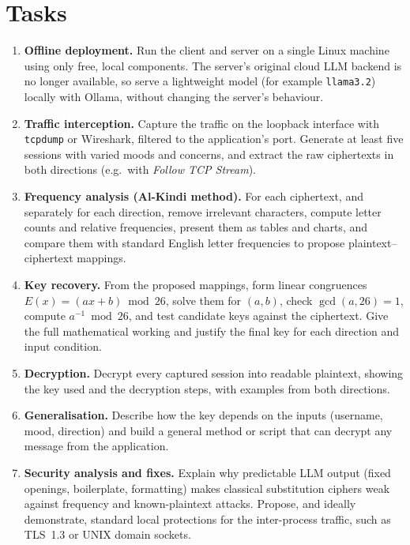 \documentclass[11pt,a4paper]{article}
\newcommand{\ct}[1]{\texttt{#1}}
\begin{document}
\section*{Tasks}
\begin{enumerate}[label=\arabic*.]
\item \textbf{Offline deployment.} Run the client and server on a single Linux machine using only free, local
      components. The server's original cloud LLM backend is no longer available, so serve a lightweight model (for
      example \ct{llama3.2}) locally with Ollama, without changing the server's behaviour.

\item \textbf{Traffic interception.} Capture the traffic on the loopback interface with \ct{tcpdump} or Wireshark,
      filtered to the application's port. Generate at least five sessions with varied moods and concerns, and
      extract the raw ciphertexts in both directions (e.g.\ with \emph{Follow TCP Stream}).

\item \textbf{Frequency analysis (Al-Kindi method).} For each ciphertext, and separately for each direction, remove
      irrelevant characters, compute letter counts and relative frequencies, present them as tables and charts, and
      compare them with standard English letter frequencies to propose plaintext--ciphertext mappings.

\item \textbf{Key recovery.} From the proposed mappings, form linear congruences
      $E(x) = (ax + b) \bmod 26$, solve them for $(a, b)$, check $\gcd(a, 26) = 1$, compute $a^{-1} \bmod 26$, and
      test candidate keys against the ciphertext. Give the full mathematical working and justify the final key for
      each direction and input condition.

\item \textbf{Decryption.} Decrypt every captured session into readable plaintext, showing the key used and the
      decryption steps, with examples from both directions.

\item \textbf{Generalisation.} Describe how the key depends on the inputs (username, mood, direction) and build a
      general method or script that can decrypt any message from the application.

\item \textbf{Security analysis and fixes.} Explain why predictable LLM output (fixed openings, boilerplate,
      formatting) makes classical substitution ciphers weak against frequency and known-plaintext attacks. Propose,
      and ideally demonstrate, standard local protections for the inter-process traffic, such as TLS~1.3 or UNIX
      domain sockets.
\end{enumerate}
\end{document}
